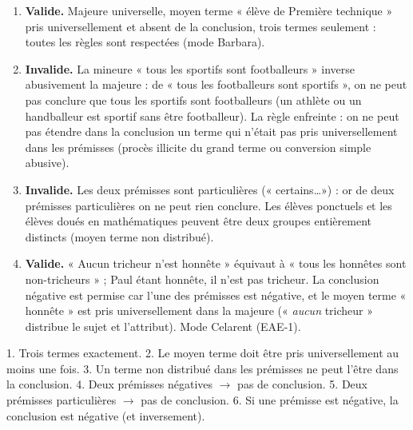 \documentclass[11pt]{article}
\begin{document}
\begin{corrige}
\begin{enumerate}
\item \textbf{Valide.} Majeure universelle, moyen terme « élève de Première technique » pris universellement et absent de la conclusion, trois termes seulement : toutes les règles sont respectées (mode Barbara).
\item \textbf{Invalide.} La mineure « tous les sportifs sont footballeurs » inverse abusivement la majeure : de « tous les footballeurs sont sportifs », on ne peut pas conclure que tous les sportifs sont footballeurs (un athlète ou un handballeur est sportif sans être footballeur). La règle enfreinte : on ne peut pas étendre dans la conclusion un terme qui n'était pas pris universellement dans les prémisses (procès illicite du grand terme ou conversion simple abusive).
\item \textbf{Invalide.} Les deux prémisses sont particulières (« certains\ldots ») : or de deux prémisses particulières on ne peut rien conclure. Les élèves ponctuels et les élèves doués en mathématiques peuvent être deux groupes entièrement distincts (moyen terme non distribué).
\item \textbf{Valide.} « Aucun tricheur n'est honnête » équivaut à « tous les honnêtes sont non-tricheurs » ; Paul étant honnête, il n'est pas tricheur. La conclusion négative est permise car l'une des prémisses est négative, et le moyen terme « honnête » est pris universellement dans la majeure (« \emph{aucun} tricheur » distribue le sujet et l'attribut). Mode Celarent (EAE-1).
\end{enumerate}
\end{corrige}

\begin{attention}
1. Trois termes exactement. 2. Le moyen terme doit être pris universellement au moins une fois. 3. Un terme non distribué dans les prémisses ne peut l'être dans la conclusion. 4. Deux prémisses négatives $\rightarrow$ pas de conclusion. 5. Deux prémisses particulières $\rightarrow$ pas de conclusion. 6. Si une prémisse est négative, la conclusion est négative (et inversement).
\end{attention}
\end{document}
